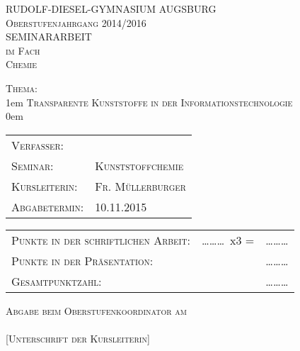 \thispagestyle{empty}

\newcommand{\subject}{Chemie}
\newcommand{\topic}{Transparente Kunststoffe in der Informationstechnologie}
\newcommand{\writer}{}
\newcommand{\seminar}{Kunststoffchemie}
\newcommand{\supervisor}{Fr. Müllerburger}
\newcommand{\deadline}{10.11.2015}

\newcommand{\ninedots}{\ldots\ldots\ldots}

\begin{center}

\textsc{\LARGE RUDOLF-DIESEL-GYMNASIUM AUGSBURG}\\[0.5cm]
\textsc{\Large Oberstufenjahrgang 2014/2016}\\[2cm]

\textsc{\LARGE SEMINARARBEIT}\\[0.25cm]
\textsc{\Large im Fach}\\[0.25cm]
\textsc{\LARGE \subject}\\[2cm]

\end{center}

\begin{flushleft}

\textsc{\Large Thema:}\\[0.25cm]
\leftskip1em
\textsc{\large \topic}\\[2cm]
\leftskip0em

\begin{tabular}{ll}
\textsc{\Large Verfasser:} & \textsc{\Large \writer}\\[0.25cm]
\textsc{\Large Seminar:} & \textsc{\Large \seminar}\\[0.25cm]
\textsc{\Large Kursleiterin:} & \textsc{\Large \supervisor}\\[0.25cm]
\textsc{\Large Abgabetermin:} & \textsc{\Large \deadline}\\[2cm]
\end{tabular}

\begin{tabular}{lll}
\textsc{\Large Punkte in der schriftlichen Arbeit:} & \ninedots~x3 = & \ninedots \\[0.25cm]
\textsc{\Large Punkte in der Präsentation:} & & \ninedots \\[0.25cm]
\textsc{\Large Gesamtpunktzahl:} & & \ninedots \\[2cm]
\end{tabular}

\textsc{\Large Abgabe beim Oberstufenkoordinator am \dotfill}\\[2cm]

\textsc{\Large \dotfill}\\
\textsc{[Unterschrift der Kursleiterin]}

\end{flushleft}
